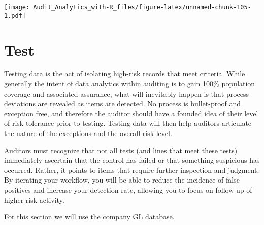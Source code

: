 \documentclass[
]{book}
\begin{document}
\texttt{[image: Audit\_Analytics\_with-R\_files/figure-latex/unnamed-chunk-105-1.pdf]}

\hypertarget{test}{%
\chapter{Test}\label{test}}

Testing data is the act of isolating high-risk records that meet criteria. While generally the intent of data analytics within auditing is to gain 100\% population coverage and associated assurance, what will inevitably happen is that process deviations are revealed as items are detected. No process is bullet-proof and exception free, and therefore the auditor should have a founded idea of their level of risk tolerance prior to testing. Testing data will then help auditors articulate the nature of the exceptions and the overall risk level.

Auditors must recognize that not all tests (and lines that meet these tests) immediately ascertain that the control has failed or that something suspicious has occurred. Rather, it points to items that require further inspection and judgment. By iterating your workflow, you will be able to reduce the incidence of false positives and increase your detection rate, allowing you to focus on follow-up of higher-risk activity.

For this section we will use the company GL database.
\end{document}
